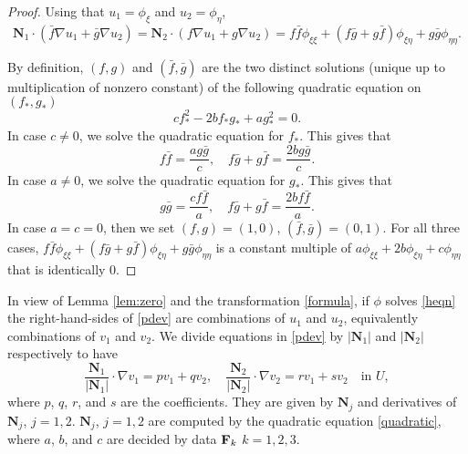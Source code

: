 \documentclass[11pt]{amsart}
\theoremstyle{plain}
\theoremstyle{remark}
\numberwithin{equation}{section}
\numberwithin{Thm}{section}
\def\N{{\mathbf N}}
\def\F{{\bf F}}
\begin{document}
\begin{proof}
Using that $u_1 = \phi_\xi$ and $u_2=\phi_\eta$,
 $$\N_1 \cdot (\bar{f}\nabla u_1  + \bar{g}\nabla u_2 ) = \N_2 \cdot ( {f}\nabla u_1 + {g}\nabla u_2 )=  {f}\bar{f} \phi_{\xi\xi} + ({f}\bar{g} + {g} \bar{f}) \phi_{\xi\eta} + {g}\bar{g} \phi_{\eta\eta}.$$
 
 By definition,  $({f},{g})$ and $(\bar{f},\bar{g})$ are the two distinct solutions (unique up to multiplication of nonzero constant) of the following quadratic equation on $({f}_*,{g}_*)$
 \begin{equation} \label{quadratic}
 c{f}_*^2  - 2b{f}_*{g}_* + a{g}_*^2   = 0.
 \end{equation}
 In case $c\ne0$, we solve the quadratic equation for ${f}_*$. This gives that 
 $${f}\bar{f} =  \frac{a{g}\bar{g}}{c}, \quad  {f}\bar{g} + {g} \bar{f} =  \frac{2b{g}\bar{g}}{c}.$$
  In case $a\ne0$, we solve the quadratic equation for ${g}_*$. This gives that 
 $${g}\bar{g} =  \frac{c{f}\bar{f}}{a}, \quad  {f}\bar{g} + {g} \bar{f} =  \frac{2b{f}\bar{f}}{a}.$$
 In case $a=c=0$, then we set $({f},{g})=(1,0)$, $(\bar{f},\bar{g}) = (0,1)$. 
 For all three cases, ${f}\bar{f} \phi_{\xi\xi} + ({f}\bar{g} + {g} \bar{f}) \phi_{\xi\eta} + {g}\bar{g} \phi_{\eta\eta}$ is a constant multiple of $a\phi_{\xi\xi} + 2b\phi_{\xi\eta} + c\phi_{\eta\eta}$ that is identically $0$.
\end{proof}
In view of Lemma \ref{lem:zero} and the transformation \eqref{formula}, if $\phi$ solves \eqref{heqn} the right-hand-sides of \eqref{pdev} are combinations of $u_1$ and $u_2$, equivalently combinations of $v_1$ and $v_2$. We divide equations in \eqref{pdev} by $|\N_1|$ and $|\N_2|$ respectively to have
\begin{equation} \label{heqn3} \frac{\N_1}{|\N_1|}\cdot\nabla v_1 = pv_1 + qv_2, \quad \frac{\N_2}{|\N_2|}\cdot\nabla v_2 = rv_1 + sv_2 \quad \text{in $U$},
\end{equation}
where $p$, $q$, $r$, and $s$ are the coefficients. They are given by $\N_j$ and derivatives of $\N_j$, $j=1,2$. $\N_j$, $j=1,2$ are computed by the quadratic equation \eqref{quadratic}, where $a$, $b$, and $c$ are decided by data $\F_k$ $k=1,2,3$. 
\end{document}
